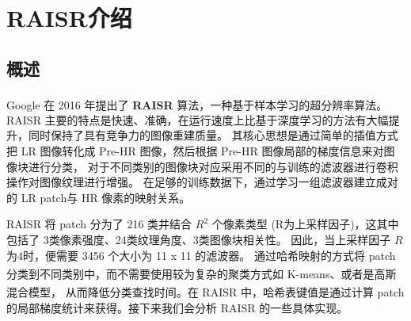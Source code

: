 \documentclass[12pt, a4paper, oneside]{ctexbook}
\begin{document}
	\section{RAISR介绍}
	\subsection{概述}
	Google 在 2016 年提出了 \textbf{RAISR}\textsuperscript{\cite{1}} 算法，一种基于样本学习的超分辨率算法。 
	RAISR 主要的特点是快速、准确，在运行速度上比基于深度学习的方法有大幅提升，同时保持了具有竞争力的图像重建质量。
	其核心思想是通过简单的插值方式把 LR 图像转化成 Pre-HR 图像，然后根据 Pre-HR 图像局部的梯度信息来对图像块进行分类，
	对于不同类别的图像块对应采用不同的与训练的滤波器进行卷积操作对图像纹理进行增强。
	在足够的训练数据下，通过学习一组滤波器建立成对的 LR patch与 HR 像素的映射关系。
	\par RAISR 将 patch 分为了 216 类并结合 $R^2$ 个像素类型 (R为上采样因子)，这其中包括了 3类像素强度、24类纹理角度、3类图像块相关性。
	因此，当上采样因子 $R$ 为4时，便需要 3456 个大小为 11 x 11 的滤波器。
	通过哈希映射的方式将 patch 分类到不同类别中，而不需要使用较为复杂的聚类方式如 K-means\textsuperscript{\cite{2}}、或者是高斯混合模型\textsuperscript{\cite{3}}，
	从而降低分类查找时间。在 RAISR 中，哈希表键值是通过计算 patch 的局部梯度统计来获得。接下来我们会分析 RAISR 的一些具体实现。
\end{document}
